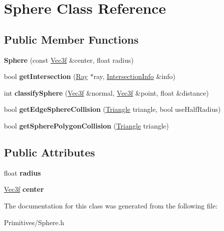 \hypertarget{class_sphere}{}\section{Sphere Class Reference}
\label{class_sphere}
\subsection*{Public Member Functions}
\begin{DoxyCompactItemize}
\item 
\mbox{\label{class_sphere_a0120b87971ff07648422716b065ed411}} 
{\bfseries Sphere} (const \hyperlink{struct_vec3f}{Vec3f} \&center, float radius)
\item 
\mbox{\label{class_sphere_a8d8da0e897f2bf41e3daea6ee89fe926}} 
bool {\bfseries get\+Intersection} (\hyperlink{class_ray}{Ray} $\ast$ray, \hyperlink{struct_intersection_info}{Intersection\+Info} \&info)
\item 
\mbox{\label{class_sphere_ac70b4e4699732c683074dd30de34257c}} 
int {\bfseries classify\+Sphere} (\hyperlink{struct_vec3f}{Vec3f} \&normal, \hyperlink{struct_vec3f}{Vec3f} \&point, float \&distance)
\item 
\mbox{\label{class_sphere_ab5c6bec837adca54bcc965c8d8f01442}} 
bool {\bfseries get\+Edge\+Sphere\+Collision} (\hyperlink{class_triangle}{Triangle} triangle, bool use\+Half\+Radius)
\item 
\mbox{\label{class_sphere_a621eff133463d069422a025fdcc9e352}} 
bool {\bfseries get\+Sphere\+Polygon\+Collision} (\hyperlink{class_triangle}{Triangle} triangle)
\end{DoxyCompactItemize}
\subsection*{Public Attributes}
\begin{DoxyCompactItemize}
\item 
\mbox{\label{class_sphere_ae6f42f0da6679a2f0b4a22681ccccf38}} 
float {\bfseries radius}
\item 
\mbox{\label{class_sphere_a187d976cfed9dd03eb9528420c32e42e}} 
\hyperlink{struct_vec3f}{Vec3f} {\bfseries center}
\end{DoxyCompactItemize}


The documentation for this class was generated from the following file\+:\begin{DoxyCompactItemize}
\item 
Primitives/Sphere.\+h\end{DoxyCompactItemize}
